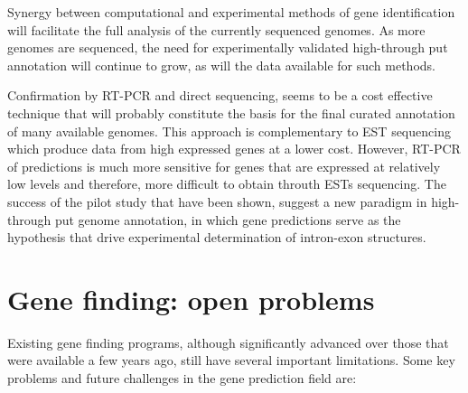Synergy between computational and experimental methods of gene
identification will facilitate the full analysis of the currently
sequenced genomes. As more genomes are sequenced, the need for
experimentally validated high-through put annotation will continue to
grow, as will the data available for such methods.

Confirmation by RT-PCR and direct sequencing, seems to be a cost
effective technique that will probably constitute the basis for the
final curated annotation of many available genomes. This approach is
complementary to EST sequencing which produce data from high expressed
genes at a lower cost. However, RT-PCR of predictions is much more
sensitive for genes that are expressed at relatively low levels and
therefore, more difficult to obtain throuth ESTs sequencing. The
success of the pilot study that have been shown, suggest a new
paradigm in high-through put genome annotation, in which gene
predictions serve as the hypothesis that drive experimental
determination of intron-exon structures.

\section{Gene finding: open problems}

Existing gene finding programs, although significantly advanced over
those that were available a few years ago, still have several
important limitations. Some key problems and future challenges in the
gene prediction field are:

